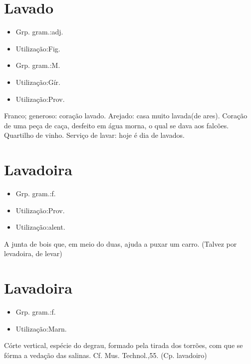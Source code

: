 \section{Lavado}
\begin{itemize}
\item {Grp. gram.:adj.}
\end{itemize}
\begin{itemize}
\item {Utilização:Fig.}
\end{itemize}
\begin{itemize}
\item {Grp. gram.:M.}
\end{itemize}
\begin{itemize}
\item {Utilização:Gír.}
\end{itemize}
\begin{itemize}
\item {Utilização:Prov.}
\end{itemize}
Franco; generoso: \textunderscore coração lavado\textunderscore .
Arejado: \textunderscore casa muito lavada\textunderscore  (de ares).
Coração de uma peça de caça, desfeito em água morna, o qual se dava aos falcões.
Quartilho de vinho.
Serviço de lavar: \textunderscore hoje é dia de lavados\textunderscore .
\section{Lavadoira}
\begin{itemize}
\item {Grp. gram.:f.}
\end{itemize}
\begin{itemize}
\item {Utilização:Prov.}
\end{itemize}
\begin{itemize}
\item {Utilização:alent.}
\end{itemize}
A junta de bois que, em meio do duas, ajuda a puxar um carro.
(Talvez por \textunderscore levadoira\textunderscore , de \textunderscore levar\textunderscore )
\section{Lavadoira}
\begin{itemize}
\item {Grp. gram.:f.}
\end{itemize}
\begin{itemize}
\item {Utilização:Marn.}
\end{itemize}
Córte vertical, espécie do degrau, formado pela tirada dos torrões, com que se fórma a vedação das salinas. Cf. \textunderscore Mus. Technol.\textunderscore ,55.
(Cp. \textunderscore lavadoiro\textunderscore )
